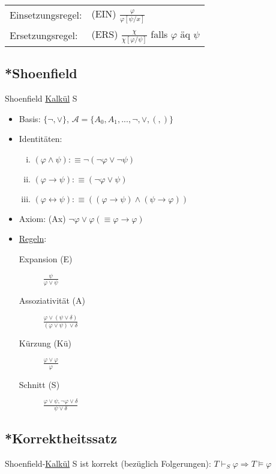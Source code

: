 \documentclass[12pt,a4paper]{article} %
\begin{document}
	\begin{tabular}{l l}
		Einsetzungsregel: & (EIN) $\frac{\varphi}{\varphi[\psi/x]}$ \\
		Ersetzungsregel: & (ERS) $\frac{\chi}{\chi[\varphi/\psi]}$ falls $\varphi$ äq $\psi$
	\end{tabular}

	\subsection{*Shoenfield}
	Shoenfield \hyperref[Kalkul]{Kalkül} S
	\begin{itemize}
		\item Basis: $\{\neg, \lor\}$, $\mathcal{A} = \{A_0, A_1, ..., \neg, \lor, (, )\}$
		\item Identitäten: \begin{enumerate}[(i)]
			\item $(\varphi \land \psi) :\equiv \neg (\neg \varphi \lor \neg \psi)$ 
			\item $(\varphi \rightarrow \psi) :\equiv (\neg \varphi \lor \psi)$
			\item $(\varphi \leftrightarrow \psi) :\equiv ((\varphi \rightarrow \psi) \land (\psi \rightarrow \varphi))$
		\end{enumerate}
		\item Axiom: (Ax) $\neg \varphi \lor \varphi (\equiv \varphi \rightarrow \varphi)$
		\item \hyperref[Kalkul]{Regeln}: \begin{description}
			\item[Expansion (E)] $\frac{\psi}{\varphi \lor \psi}$
			\item[Assoziativität (A)] $\frac{\varphi \lor (\psi \lor \delta)}{(\varphi \lor \psi) \lor \delta}$
			\item [Kürzung (Kü)] $\frac{\varphi \lor \varphi}{\varphi}$
			\item [Schnitt (S)] $\frac{\varphi \lor \psi, \neg \varphi \lor \delta}{\psi \lor \delta}$
		\end{description}
	\end{itemize}
	
	\subsection{*Korrektheitssatz}
	Shoenfield-\hyperref[Kalkul]{Kalkül} S ist korrekt (bezüglich Folgerungen): $T \hyperref[Beweisbar]{\vdash_S} \varphi \Rightarrow T \hyperref[Erfullbar]{\vDash} \varphi$
	
\end{document}
